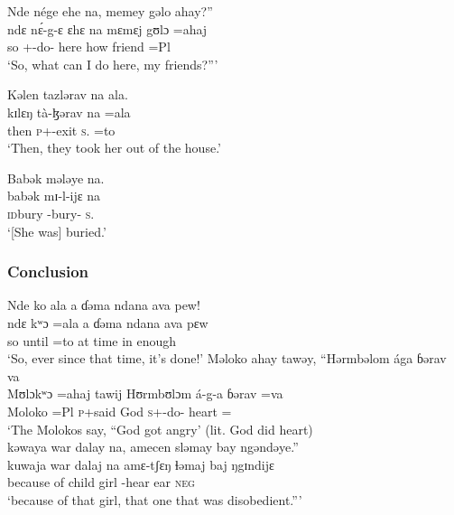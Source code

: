  \medskip
 Nde  nége  ehe  na,  memey  gəlo  ahay?” \\
 \gll ndɛ   n\'ɛ-g-ɛ    ɛhɛ     na     mɛmɛj  gʊlɔ  =ahaj\\
 so  {\oneS}+{\IFV}-do{}-{\CL}  here   {\PSP}  how     friend   =Pl\\
 \glt ‘So, what can I do here, my friends?”’\\
 \z
 
 \ea  Kəlen  tazlərav   na  ala.    \\
 \gll kɪlɛŋ  tà-ɮərav          na       =ala    \\
 then    \textsc{p}+{\PFV}-exit  \textsc{s}.{\DO}  =to \\
 \glt ‘Then, they took her out of the house.’
 \z
 
 \ea  Babək  mələye  na.\\
\gll babək   mɪ-l-ijɛ        na\\
 \textsc{id}bury  {\NOM}-bury-{\CL}  \textsc{s}.{\DO}\\
 \glt ‘[She was] buried.’
 \z
 
\subsubsection*{Conclusion}
 \ea  Nde  ko  ala  a  ɗəma  ndana  ava  pew!\\
 \gll ndɛ    kʷɔ       =ala  a    ɗəma   ndana    ava      pɛw\\
 so    until  =to    at    time      {\DEM}    in    enough\\
 \glt ‘So, ever since that time, it’s done!’
 \z
 \ea  Məloko  ahay  tawəy,  “Hərmbəlom  ága  ɓərav  va  \\
 \gll Mʊlɔkʷɔ  =ahaj  tawij  Hʊrmbʊlɔm     á-g-a      ɓərav   =va  \\
 Moloko     =Pl       \textsc{p}+said  God        \textsc{s}+{\IFV}-do-{\CL} heart    ={\PRF}     \\
 \glt ‘The Molokos say, “God got angry’ (lit. God did heart)\\
 
 \medskip
  kəwaya  war  dalay  na,  amecen  sləmay  bay  ngəndəye.”\\
\gll kuwaja        war    dalaj     na amɛ-tʃɛŋ      ɬəmaj  baj     ŋgɪndijɛ\\
 {because of}  child    girl    {\PSP}  {\DEP}-hear   ear      \textsc{neg}  {\DEM}\\
 \glt ‘because of that girl, that one that was disobedient.”’
 \z
 
